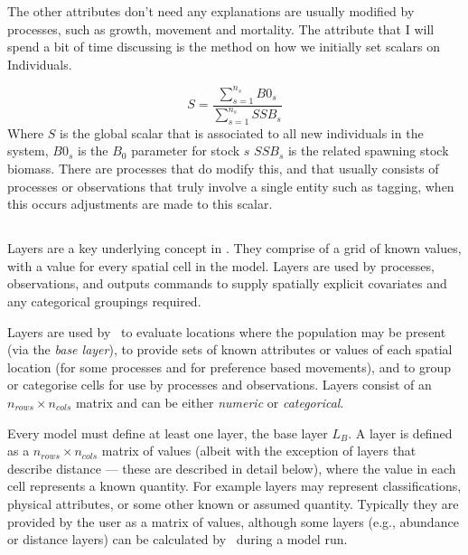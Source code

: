 The other attributes don't need any explanations are usually modified by processes, such as growth, movement and mortality. The attribute that I will spend a bit of time discussing is the method on how we initially set scalars on Individuals.

\begin{equation}
	S = \frac{\sum_{s = 1}^{n_s}B0_s}{\sum_{s = 1}^{n_s}SSB_s}
\end{equation}
Where $S$ is the global scalar that is associated to all new individuals in the system, $B0_s$ is the $B_0$ parameter for stock $s$ $SSB_s$ is the related spawning stock biomass. There are processes that do modify this, and that usually consists of processes or observations that truly involve a single entity such as tagging, when this occurs adjustments are made to this scalar.

\subsection{\label{sec:layers}}

Layers are a key underlying concept in \IBM. They comprise of a grid of known values, with a value for every spatial cell in the model. Layers are used by processes, observations, and outputs commands to supply spatially explicit covariates and any categorical groupings required. 

Layers are used by \IBM\ to evaluate locations where the population may be present (via the \emph{base layer}), to provide sets of known attributes or values of each spatial location (for some processes and for preference based movements), and to group or categorise cells for use by processes and observations. Layers consist of an $n_{rows} \times n_{cols}$ matrix and can be either \emph{numeric} or \emph{categorical}. 

Every model must define at least one layer, the base layer $L_B$. A layer is defined as a $n_{rows} \times n_{cols}$ matrix of values (albeit with the exception of layers that describe distance --- these are described in detail below), where the value in each cell represents a known quantity. For example layers may represent classifications, physical attributes, or some other known or assumed quantity. Typically they are provided by the user as a matrix of values, although some layers (e.g., abundance or distance layers) can be calculated by \IBM\ during a model run. 

